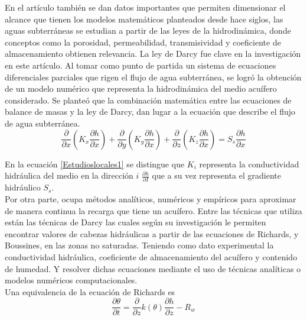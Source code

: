 En el artículo también se dan datos importantes que permiten dimensionar el alcance que tienen los modelos matemáticos planteados desde hace siglos, las aguas subterráneas se estudian a partir de las leyes de la hidrodinámica, donde conceptos como la porosidad, permeabilidad,  transmisividad y coeficiente de almacenamiento  obtienen relevancia. La ley de Darcy fue clave en la investigación en este artículo. Al tomar como punto de partida un sistema de ecuaciones diferenciales parciales que rigen el flujo de agua subterránea, se logró la obtención de un modelo numérico que representa la hidrodinámica del medio acuífero considerado.  Se planteó que la combinación matemática entre las ecuaciones de balance de masas y la ley de Darcy,  dan lugar a la ecuación que describe el flujo de agua subterránea. 
\begin{equation}
	\frac{\partial }{\partial x}\left ( K_{x}\frac{\partial h}{\partial x} \right ) +\frac{\partial }{\partial y}\left ( K_{y}\frac{\partial h}{\partial x} \right ) +\frac{\partial }{\partial z}\left ( K_{z}\frac{\partial h}{\partial x} \right ) = S_{s}\frac{\partial h}{\partial x}
	\label{Estudioslocales1}    
\end{equation}

En la ecuación \eqref{Estudioslocales1} se distingue que $K_{i}$ representa la conductividad hidráulica del medio en la dirección $i$  $\frac{\partial h}{\partial I}$ que a su vez  representa el gradiente hidráulico $S_{s}$.\\

Por otra parte, \parencite{velez2004metodos} ocupa métodos analíticos, numéricos y empíricos para aproximar de manera continua la recarga que tiene un acuífero. Entre las técnicas que utiliza están las técnicas de Darcy las cuales según su investigación le permiten encontrar valores de cabezas hidráulicas a partir de las ecuaciones de Richards, y 
Boussines,  en las zonas no saturadas. Teniendo como dato experimental la conductividad  hidráulica, coeficiente de almacenamiento del acuífero y contenido de humedad. Y resolver dichas ecuaciones mediante el uso de técnicas analíticas o modelos numéricos computacionales.\\

Una equivalencia de la  ecuación de Richards es 
\begin{equation}
	\frac{\partial \theta }{\partial t} = \frac{\partial }{\partial z} k (\theta)\frac{\partial h }{\partial z} - R_{w}
	\label{Estudioslocales2}    
\end{equation}

